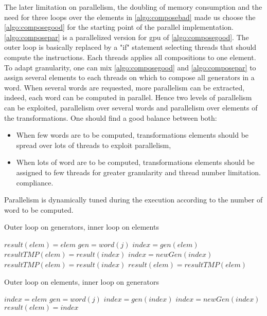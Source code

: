 {The later limitation on parallelism, the doubling of memory consumption and the need for three loops over the elements in \autoref{algo:composebad} made us choose the \autoref{algo:composegood} for the starting point of the parallel implementation.
\autoref{algo:composepar} is a parallelized version for \gls{gpu} of \autoref{algo:composegood}. The outer loop is basically replaced by a "if" statement selecting threads that should compute the instructions. Each threads applies all compositions to one element. To adapt granularity, one can mix \autoref{algo:composegood} and \autoref{algo:composepar} to assign several elements to each threads on which to compose all generators in a word.
When several words are requested, more parallelism can be extracted, indeed, each word can be computed in parallel. Hence two levels of parallelism can be exploited, parallelism over several words and parallelism over elements of the transformations. One should find a good balance between both:
\begin{itemize}
\item When few words are to be computed, transformations elements should be spread over lots of threads to exploit parallelism,
\item When lots of word are to be computed, transformations elements should be assigned to few threads for greater granularity and thread number limitation. compliance.
\end{itemize}
Parallelism is dynamically tuned during the execution according to the number of word to be computed.



\begin{algorithm}
\caption{Outer loop on generators, inner loop on elements}
\label{algo:composebad}
\begin{algorithmic}
\STATE $result(elem) = elem$
\ENDFOR
{}
\STATE $gen = word(j)$
\STATE $index = gen(elem)$
\STATE $resultTMP(elem) = result(index)$
\ENDFOR
\STATE $index = newGen(index)$
\STATE $resultTMP(elem) = result(index)$
\STATE $result(elem) = resultTMP(elem)$
\ENDFOR
\ENDFOR
\end{algorithmic}
\end{algorithm}



\begin{algorithm}
\caption{Outer loop on elements, inner loop on generators}
\label{algo:composegood}
\begin{algorithmic}
\STATE $index = elem$
\STATE $gen = word(j)$
\STATE $index = gen(index)$
\ENDFOR
\STATE $index = newGen(index)$
\STATE $result(elem) = index$
\ENDFOR
\end{algorithmic}
\end{algorithm}


}
